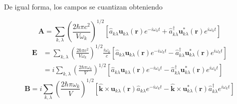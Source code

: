 De igual forma, los campos se cuantizan obteniendo \cite{Agarwal_2012}

\begin{equation*}
  \mathbf{A} =  \sum_{k,\lambda} \left( \frac{2\hbar \pi c^2}{V\omega_k} \right)^{1/2} \left[ \hat{a}_{k\lambda} \mathbf{u}_{k\lambda} (\mathbf{r})e^{-i\omega_k t} + \hat{a}^{\dagger}_{k\lambda} \mathbf{u}_{k\lambda}^* (\mathbf{r})e^{i\omega_{k} t} \right]
\end{equation*}
\begin{align*}
  \mathbf{E} & = \sum_{k,\lambda} \left( \frac{2\hbar \pi c^2}{V\omega_k} \right)^{1/2} \frac{i\omega_{k}}{c} \left[ \hat{a}_{k\lambda} \mathbf{u}_{k\lambda} (\mathbf{r})e^{-i\omega_k t} -  \hat{a}^{\dagger}_{k\lambda} \mathbf{u}_{k\lambda}^* (\mathbf{r})e^{i\omega_{k} t} \right] \\
             & = i \sum_{k,\lambda} \left( \frac{2\hbar \pi \omega_k}{V} \right)^{1/2} \left[ \hat{a}_{k\lambda} \mathbf{u}_{k\lambda} (\mathbf{r})e^{-i\omega_k t} -  \hat{a}^{\dagger}_{k\lambda} \mathbf{u}_{k\lambda}^* (\mathbf{r})e^{i\omega_{k} t} \right]
\end{align*}
\begin{equation*}
  \mathbf{B} = i \sum_{k,\lambda} \left( \frac{2\hbar \pi \omega_k}{V} \right)^{1/2} \left[ \mathbf{\hat{k}} \times \mathbf{u}_{k\lambda}(\mathbf{r}) \hat{a}_{k\lambda} e^{-i\omega_k t} - \mathbf{\hat{k}} \times \mathbf{u}_{k\lambda}^* (\mathbf{r}) \hat{a}^{\dagger}_{k\lambda} e^{i\omega_{k} t} \right]
\end{equation*}